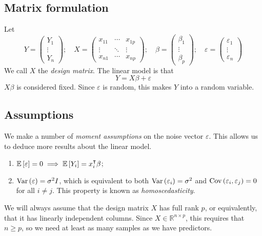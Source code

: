 \subsection{Matrix formulation}
Let
\[
	Y = \begin{pmatrix}
		Y_1    \\
		\vdots \\
		Y_n
	\end{pmatrix};\quad X = \begin{pmatrix}
		x_{11} & \cdots & x_{1p} \\
		\vdots & \ddots & \vdots \\
		x_{n1} & \cdots & x_{np}
	\end{pmatrix};\quad \beta = \begin{pmatrix}
		\beta_1 \\
		\vdots  \\
		\beta_p
	\end{pmatrix};\quad \varepsilon = \begin{pmatrix}
		\varepsilon_1 \\
		\vdots        \\
		\varepsilon_n
	\end{pmatrix}
\]
We call \( X \) the \textit{design matrix}.
The linear model is that
\[
	Y = X\beta + \varepsilon
\]
\( X\beta \) is considered fixed.
Since \( \varepsilon \) is random, this makes \( Y \) into a random variable.

\subsection{Assumptions}
We make a number of \textit{moment assumptions} on the noise vector \( \varepsilon \).
This allows us to deduce more results about the linear model.
\begin{enumerate}
	\item \( \mathbb{E}\left[{\varepsilon}\right] = 0 \implies \mathbb{E}\left[{Y_i}\right] = x_i^\intercal \beta \);
	\item \( \operatorname{Var}\left({\varepsilon}\right) = \sigma^2 I \), which is equivalent to both \( \operatorname{Var}\left({\varepsilon_i}\right) = \sigma^2 \) and \( \operatorname{Cov}\left({\varepsilon_i, \varepsilon_j}\right) = 0 \) for all \( i \neq j \).
	      This property is known as \textit{homoscedasticity}.
\end{enumerate}
We will always assume that the design matrix \( X \) has full rank \( p \), or equivalently, that it has linearly independent columns.
Since \( X \in \mathbb R^{n \times p} \), this requires that \( n \geq p \), so we need at least as many samples as we have predictors.

